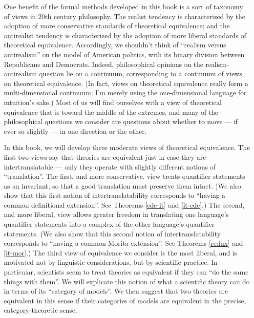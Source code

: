 One benefit of the formal methods developed in this book is a sort of
taxonomy of views in 20th century philosophy.  The realist tendency is
characterized by the adoption of more conservative standards of
theoretical equivalence; and the antirealist tendency is characterized
by the adoption of more liberal standards of theoretical equivalence.
Accordingly, we shouldn't think of ``realism versus antirealism'' on
the model of American politics, with its binary division between
Republicans and Democrats.  Indeed, philosophical opinions on the
realism-antirealism question lie on a continuum, corresponding to a
continuum of views on theoretical equivalence.  (In fact, views on
theoretical equivalence really form a multi-dimensional continuum; I'm
merely using the one-dimensional language for intuition's sake.)  Most
of us will find ourselves with a view of theoretical equivalence that
is toward the middle of the extremes, and many of the philosophical
questions we consider are questions about whether to move --- if ever
so slightly --- in one direction or the other.

In this book, we will develop three moderate views of theoretical
equivalence.  The first two views say that theories are equivalent
just in case they are intertranslatable --- only they operate with
slightly different notions of ``translation''.  The first, and more
conservative, view treats quantifier statements as an invariant, so
that a good translation must preserve them intact.  (We also show that
this first notion of intertranslatability corresponds to ``having a
common definitional extension''. See Theorems \ref{cde-it} and
\ref{it-cde}.) The second, and more liberal, view allows greater
freedom in translating one language's quantifier statements into a
complex of the other language's quantifier statements.  (We also show
that this second notion of intertranslatability corresponds to
``having a common Morita extension''.  See Theorems \ref{redux} and
\ref{it-mor}.)  The third view of equivalence we consider is the most
liberal, and is motivated not by linguistic considerations, but by
scientific practice.  In particular, scientists seem to treat theories
as equivalent if they can ``do the same things with them''.  We will
explicate this notion of what a scientific theory can do in terms of
its ``category of models''.  We then suggest that two theories are
equivalent in this sense if their categories of models are equivalent
in the precise, category-theoretic sense.


